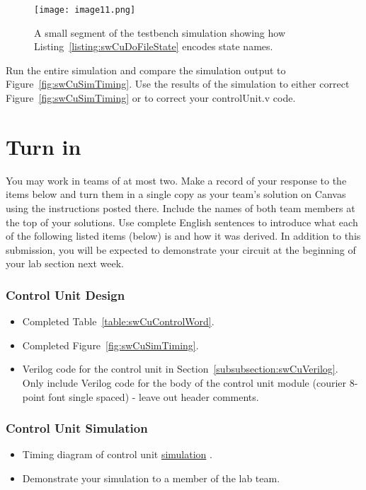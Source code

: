 \begin{figure}[ht]
\texttt{[image: image11.png]}
\caption{A small segment of the testbench simulation showing how
Listing~\ref{listing:swCuDoFileState} encodes state names.}
\label{fig:swCuTestbenchTiming}
\end{figure}

Run the entire simulation and compare the simulation output to Figure~\ref{fig:swCuSimTiming}.
Use the results of the simulation to either correct Figure~\ref{fig:swCuSimTiming} or
to correct your controlUnit.v code.

\section{Turn in}

You may work in teams of at most two. Make a record of your response to
the items below and turn them in a single copy as your team's solution
on Canvas using the instructions posted there. Include the names of both
team members at the top of your solutions. Use complete English
sentences to introduce what each of the following listed items (below)
is and how it was derived. In addition to this submission, you will be
expected to demonstrate your circuit at the beginning of your lab
section next week.

\subsubsection{Control Unit Design}

\begin{itemize}
\item
    Completed Table~\ref{table:swCuControlWord}.
\item
    Completed Figure~\ref{fig:swCuSimTiming}.
\item
    Verilog code for the control unit in Section~\ref{subsubsection:swCuVerilog}.  Only
    include Verilog code for the body of the control unit module (courier 8-point
    font single spaced) - leave out header comments.
\end{itemize}

\subsubsection{Control Unit Simulation}

\begin{itemize}
\item
    Timing diagram of control unit \hyperlink{swCuWaveform}{simulation} .
\end{itemize}

\begin{itemize}
\item
    Demonstrate your simulation to a member of the lab team.
\end{itemize}
